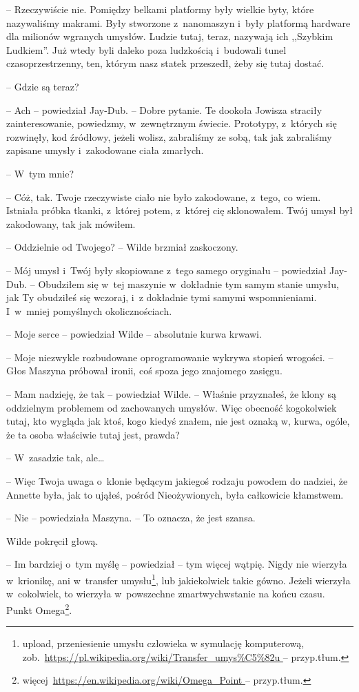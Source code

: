 \documentclass[oneside,polish,11pt,sfheadings]{mwbk}
\begin{document}
-- Rzeczywiście nie. Pomiędzy belkami platformy były wielkie byty, które
nazywaliśmy makrami. Były stworzone z~nanomaszyn i~były platformą
hardware dla milionów wgranych umysłów. Ludzie tutaj, teraz, nazywają
ich ,,Szybkim Ludkiem''. Już wtedy byli daleko poza ludzkością i~budowali
tunel czasoprzestrzenny, ten, którym nasz statek przeszedł, żeby się
tutaj dostać.

-- Gdzie są teraz?

-- Ach -- powiedział Jay-Dub. -- Dobre pytanie. Te dookoła Jowisza straciły
zainteresowanie, powiedzmy, w~zewnętrznym świecie. Prototypy, z~których
się rozwinęły, kod źródłowy, jeżeli wolisz, zabraliśmy ze sobą, tak jak
zabraliśmy zapisane umysły i~zakodowane ciała zmarłych.

-- W~tym mnie?

-- Cóż, tak. Twoje rzeczywiste ciało nie było zakodowane, z~tego, co
wiem. Istniała próbka tkanki, z~której potem, z~której cię sklonowałem.
Twój umysł był zakodowany, tak jak mówiłem.

-- Oddzielnie od Twojego? -- Wilde brzmiał zaskoczony.

-- Mój umysł i~Twój były skopiowane z~tego samego oryginału -- powiedział
Jay-Dub. -- Obudziłem się w~tej maszynie w~dokładnie tym samym stanie
umysłu, jak Ty obudziłeś się wczoraj, i~z dokładnie tymi samymi
wspomnieniami. I~w~mniej pomyślnych okolicznościach.

-- Moje serce -- powiedział Wilde -- absolutnie kurwa krwawi.

-- Moje niezwykle rozbudowane oprogramowanie wykrywa stopień wrogości. -- Głos Maszyna próbował ironii, coś spoza jego znajomego zasięgu.

-- Mam nadzieję, że tak -- powiedział Wilde. -- Właśnie przyznałeś, że
klony są oddzielnym problemem od zachowanych umysłów. Więc obecność
kogokolwiek tutaj, kto wygląda jak ktoś, kogo kiedyś znałem, nie jest
oznaką w, kurwa, ogóle, że ta osoba właściwie tutaj jest, prawda?

-- W~zasadzie tak, ale\ldots

-- Więc Twoja uwaga o~klonie będącym jakiegoś rodzaju powodem do nadziei,
że Annette była, jak to ująłeś, pośród Nieożywionych, była całkowicie
kłamstwem.

-- Nie -- powiedziała Maszyna. -- To oznacza, że jest szansa.

Wilde pokręcił głową.

-- Im bardziej o~tym myślę -- powiedział -- tym więcej wątpię. Nigdy nie
wierzyła w~krionikę, ani w~transfer umysłu\footnote{ upload, przeniesienie umysłu człowieka w symulację komputerową, zob.~\url{https://pl.wikipedia.org/wiki/Transfer_umys\%C5\%82u
} -- przyp.tłum.}, lub jakiekolwiek takie gówno. Jeżeli wierzyła w~cokolwiek, to wierzyła w~powszechne zmartwychwstanie na końcu czasu.
Punkt Omega\footnote{więcej~\url{https://en.wikipedia.org/wiki/Omega_Point } -- przyp.tłum.}.
\end{document}
